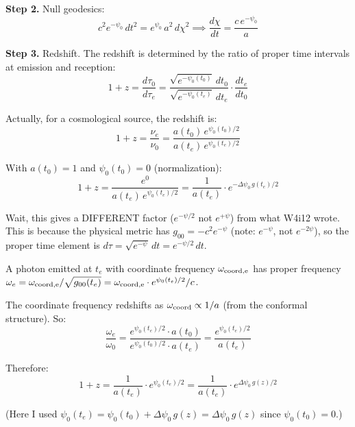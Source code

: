 \documentclass[11pt,a4paper]{article}
\begin{document}
\textbf{Step 2.} Null geodesics:
\begin{equation}
c^2 e^{-\psi_0}\,dt^2 = e^{\psi_0}\,a^2\,d\chi^2
\implies \frac{d\chi}{dt} = \frac{c\,e^{-\psi_0}}{a}
\end{equation}

\textbf{Step 3.} Redshift. The redshift is determined by the ratio of
proper time intervals at emission and reception:
\begin{equation}
1 + z = \frac{d\tau_0}{d\tau_e} = \frac{\sqrt{e^{-\psi_0(t_0)}}\,dt_0}
{\sqrt{e^{-\psi_0(t_e)}}\,dt_e}
\cdot \frac{dt_e}{dt_0}
\end{equation}

Actually, for a cosmological source, the redshift is:
\begin{equation}
1 + z = \frac{\nu_e}{\nu_0} = \frac{a(t_0)\,e^{\psi_0(t_0)/2}}
{a(t_e)\,e^{\psi_0(t_e)/2}}
\end{equation}

With $a(t_0) = 1$ and $\psi_0(t_0) = 0$ (normalization):
\begin{equation}
1 + z = \frac{e^{0}}{a(t_e)\,e^{\psi_0(t_e)/2}}
= \frac{1}{a(t_e)} \cdot e^{-\Delta\psi_0\,g(t_e)/2}
\end{equation}

Wait, this gives a DIFFERENT factor ($e^{-\psi/2}$ not $e^{+\psi}$)
from what W4i12 wrote. This is because the physical metric has
$g_{00} = -c^2 e^{-\psi}$ (note: $e^{-\psi}$, not $e^{-2\psi}$),
so the proper time element is $d\tau = \sqrt{e^{-\psi}}\,dt
= e^{-\psi/2}\,dt$.

A photon emitted at $t_e$ with coordinate frequency $\omega_{\rm coord,e}$
has proper frequency $\omega_e = \omega_{\rm coord,e}/\sqrt{g_{00}(t_e)}
= \omega_{\rm coord,e} \cdot e^{\psi_0(t_e)/2}/c$.

The coordinate frequency redshifts as $\omega_{\rm coord} \propto 1/a$
(from the conformal structure). So:
\begin{equation}
\frac{\omega_e}{\omega_0} = \frac{e^{\psi_0(t_e)/2} \cdot a(t_0)}
{e^{\psi_0(t_0)/2} \cdot a(t_e)} = \frac{e^{\psi_0(t_e)/2}}{a(t_e)}
\end{equation}

Therefore:
\begin{equation}
\boxed{
1 + z = \frac{1}{a(t_e)} \cdot e^{\psi_0(t_e)/2}
= \frac{1}{a(t_e)} \cdot e^{\Delta\psi_0\,g(z)/2}
}
\label{eq:redshift-physical}
\end{equation}

(Here I used $\psi_0(t_e) = \psi_0(t_0) + \Delta\psi_0\,g(z)
= \Delta\psi_0\,g(z)$ since $\psi_0(t_0) = 0$.)
\end{document}
